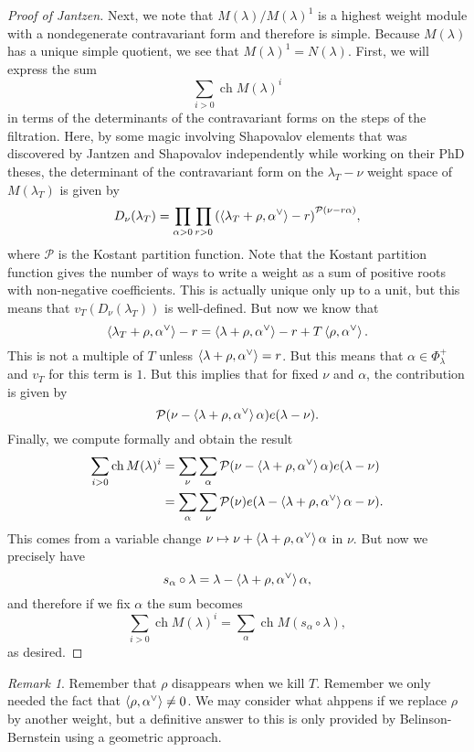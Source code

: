 \documentclass[leqno, openany]{memoir}
\theoremstyle{definition}
\theoremstyle{remark}
\newtheorem{rmk}[thm]{Remark}
\theoremstyle{plain}
\theoremstyle{definition}
\theoremstyle{remark}
\newcommand{\mc}[1]{\mathcal{#1}}
\DeclareMathOperator{\ch}{ch}
\begin{document}
\begin{proof}[Proof of Jantzen]
  Next, we note that $M(\lambda) / M(\lambda)^1$ is a highest weight module with a nondegenerate contravariant form and therefore is simple. Because $M(\lambda)$ has a unique simple quotient, we see that $M(\lambda)^1 = N(\lambda)$. First, we will express the sum
  \[ \sum_{i > 0} \ch M(\lambda)^i\]
  in terms of the determinants of the contravariant forms on the steps of the filtration. Here, by some magic involving Shapovalov elements that was discovered by Jantzen and Shapovalov independently while working on their PhD theses, the determinant of the contravariant form on the $\lambda_T - \nu$ weight space of $M(\lambda_T)$ is given by
  \[ D_{\nu}(\lambda_T) = \prod_{\alpha > 0} \prod_{r > 0} \qty(\ev{\lambda_T + \rho, \alpha^{\vee}} - r)^{\mc{P}(\nu - r \alpha)}, \]
  where $\mc{P}$ is the Kostant partition function. Note that the Kostant partition function gives the number of ways to write a weight as a sum of positive roots with non-negative coefficients. This is actually unique only up to a unit, but this means that $v_T(D_{\nu}(\lambda_T))$ is well-defined. But now we know that
  \[ \ev{\lambda_T + \rho, \alpha^{\vee}} - r = \ev{\lambda + \rho, \alpha^{\vee}} - r + T \ev{\rho, \alpha^{\vee}}. \]
  This is not a multiple of $T$ unless $\ev{\lambda + \rho, \alpha^{\vee}} = r$. But this means that $\alpha \in \Phi_{\lambda}^+$ and $v_T$ for this term is $1$. But this implies that for fixed $\nu$ and $\alpha$, the contribution is given by
  \[ \mc{P}(\nu - \ev{\lambda + \rho, \alpha^{\vee}} \alpha) e(\lambda - \nu). \]
  Finally, we compute formally and obtain the result
  \begin{align*}
    \sum_{i > 0} \ch M(\lambda)^i &= \sum_{\nu} \sum_{\alpha} \mc{P}\qty(\nu - \ev{\lambda + \rho, \alpha^{\vee}} \alpha) e(\lambda - \nu) \\
    &= \sum_{\alpha} \sum_{\nu} \mc{P}(\nu) e\qty(\lambda - \ev{\lambda + \rho, \alpha^{\vee}} \alpha - \nu).
  \end{align*}
  This comes from a variable change $\nu \mapsto \nu + \ev{\lambda + \rho, \alpha^{\vee}} \alpha$ in $\nu$. But now we precisely have
  \[ s_{\alpha} \circ \lambda = \lambda - \ev{\lambda + \rho, \alpha^{\vee}} \alpha, \]
  and therefore if we fix $\alpha$ the sum becomes
  \[ \sum_{i > 0} \ch M(\lambda)^i = \sum_{\alpha} \ch M(s_{\alpha} \circ \lambda), \]
  as desired.
\end{proof}

\begin{rmk}
  Remember that $\rho$ disappears when we kill $T$. Remember we only needed the fact that $\ev{\rho, \alpha^{\vee}} \neq 0$. We may consider what ahppens if we replace $\rho$ by another weight, but a definitive answer to this is only provided by Belinson-Bernstein using a geometric approach.
\end{rmk}
\end{document}
